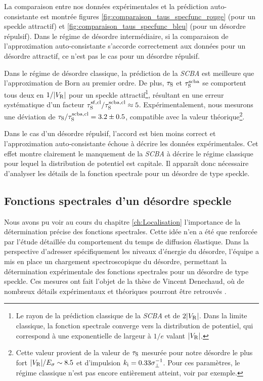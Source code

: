 La comparaison entre nos données expérimentales et la prédiction auto-consistante est montrée figures \ref{fig:comparaison_taus_specfunc_rouge} (pour un speckle attractif) et \ref{fig:comparaison_taus_specfunc_bleu} (pour un désordre répulsif). Dans le régime de désordre intermédiaire, si la comparaison de l'approximation auto-consistante s'accorde correctement aux données pour un désordre attractif, ce n'est pas le cas pour un désordre répulsif. 

Dans le régime de désordre classique, la prédiction de la \textit{SCBA} est meilleure que l'approximation de Born au premier ordre. De plus, $\tau_{\mathrm{S}}$ et $\tau_{\mathrm{S}}^{\mathrm{scba}}$ se comportent tous deux en $1/|V_{\mathrm{R}}|$ pour un speckle attractif\footnote{Le rayon de la prédiction classique de la \textit{SCBA} et de $2|V_{\mathrm{R}}|$. Dans la limite classique, la fonction spectrale converge vers la distribution de potentiel, qui correspond à une exponentielle de largeur à $1/e$ valant $|V_{\mathrm{R}}|$.}, résultant en une erreur systématique d'un facteur $\tau_{\mathrm{S}}^{\mathrm{sf,cl}}/\tau_{\mathrm{S}}^{\mathrm{scba,cl}}\approx 5$. Expérimentalement, nous mesurons une déviation de $\tau_{\mathrm{S}}/\tau_{\mathrm{S}}^{\mathrm{scba,cl}}=3.2\pm0.5$, compatible avec la valeur théorique\footnote{Cette valeur provient de la valeur de $\tau_{\mathrm{S}}$ mesurée pour notre désordre le plus fort $|V_{\mathrm{R}}|/E_{\sigma}\sim 8.5$ et d'impulsion $k_{\mathrm{i}}=0.33\sigma_{\perp}^{-1}$. Pour ces paramètres, le régime classique n'est pas encore entièrement atteint, voir \citep{prat2016semiclassical} par exemple.}. 

Dans le cas d'un désordre répulsif, l'accord est bien moins correct et l'approximation auto-consistante échoue à décrire les données expérimentales. Cet effet montre clairement le manquement de la \textit{SCBA} à décrire le régime classique pour lequel la distribution de potentiel est capitale. Il apparaît donc nécessaire d'analyser les détails de la fonction spectrale pour un désordre de type speckle.







\subsection{Fonctions spectrales d'un désordre speckle}
Nous avons pu voir au cours du chapitre \ref{ch:Localisation} l'importance de la détermination précise des fonctions spectrales. Cette idée n'en a été que renforcée par l'étude détaillée du comportement du temps de diffusion élastique. Dans la perspective d'adresser spécifiquement les niveaux d'énergie du désordre, l'équipe a mis en place un chargement spectroscopique du désordre, permettant la détermination expérimentale des fonctions spectrales pour un désordre de type speckle. Ces mesures ont fait l'objet de la thèse de Vincent Denechaud, où de nombreux détails expérimentaux et théoriques pourront être retrouvés \citep{denechaud2018vers}.


